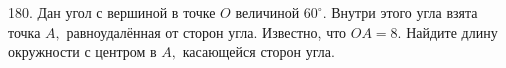 180. Дан угол с вершиной в точке $O$ величиной $60^\circ.$ Внутри этого угла взята точка $A,$ равноудалённая от сторон угла. Известно, что $OA=8.$ Найдите длину окружности с центром в $A,$ касающейся сторон угла.\\
